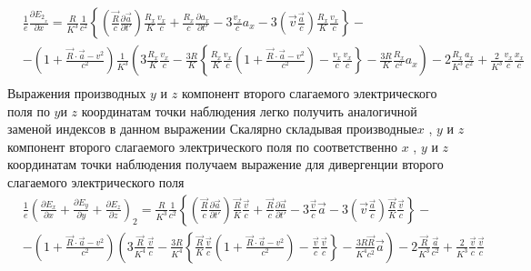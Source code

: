 \documentclass[11pt]{article}
\begin{document}
\[\begin{align}
  & \frac{1}{e}\frac{\partial {{E}_{2}}_{_{x}}}{\partial x}=\frac{R}{{{K}^{3}}}\frac{1}{{{c}^{2}}}\left\{ \left( \frac{\overrightarrow{R}}{c}\frac{\partial \overrightarrow{a}}{\partial t'} \right)\frac{{{R}_{x}}}{K}\frac{{{v}_{x}}}{c}+\frac{{{R}_{x}}}{c}\frac{\partial {{a}_{x}}}{\partial t'}-3\frac{{{v}_{x}}}{c}{{a}_{x}}-3\left( \overrightarrow{v}\frac{\overrightarrow{a}}{c} \right)\frac{{{R}_{x}}}{K}\frac{{{v}_{x}}}{c} \right\}- \\
 & -\left( 1+\frac{\overrightarrow{R}\cdot \overrightarrow{a}-{{v}^{2}}}{{{c}^{2}}} \right)\frac{1}{{{K}^{3}}}\left( 3\frac{{{R}_{x}}}{K}\frac{{{v}_{x}}}{c}-\frac{3R}{K}\left\{ \frac{{{R}_{x}}}{K}\frac{{{v}_{x}}}{c}\left( 1+\frac{\overrightarrow{R}\cdot \overrightarrow{a}-{{v}^{2}}}{{{c}^{2}}} \right)-\frac{{{v}_{x}}}{c}\frac{{{v}_{x}}}{c} \right\}-\frac{3R}{K}\frac{{{R}_{x}}}{{{c}^{2}}}{{a}_{x}} \right)-2\frac{{{R}_{x}}}{{{K}^{3}}}\frac{{{a}_{x}}}{{{c}^{2}}}+\frac{2}{{{K}^{3}}}\frac{{{v}_{x}}}{c}\frac{{{x}_{x}}}{c} \\
\end{align}\] Выражения производных \(y\) и \(z\) компонент второго
слагаемого электрического поля по \(y\)и \(z\) координатам точки
наблюдения легко получить аналогичной заменой индексов в данном
выражении Скалярно складывая производные\(x\) , \(y\) и \(z\)компонент
второго слагаемого электрического поля по соответственно \(x\) , \(y\) и
\(z\)координатам точки наблюдения получаем выражение для дивергенции
второго слагаемого электрического поля \[\begin{align}
  & \frac{1}{e}{{\left( \frac{\partial {{E}_{x}}}{\partial x}+\frac{\partial {{E}_{y}}}{\partial y}+\frac{\partial {{E}_{z}}}{\partial z} \right)}_{2}}=\frac{R}{{{K}^{3}}}\frac{1}{{{c}^{2}}}\left\{ \left( \frac{\overrightarrow{R}}{c}\frac{\partial \overrightarrow{a}}{\partial t'} \right)\frac{\overrightarrow{R}}{K}\frac{\overrightarrow{v}}{c}+\frac{\overrightarrow{R}}{c}\frac{\partial \overrightarrow{a}}{\partial t'}-3\frac{\overrightarrow{v}}{c}\overrightarrow{a}-3\left( \overrightarrow{v}\frac{\overrightarrow{a}}{c} \right)\frac{\overrightarrow{R}}{K}\frac{\overrightarrow{v}}{c} \right\}- \\
 & -\left( 1+\frac{\overrightarrow{R}\cdot \overrightarrow{a}-{{v}^{2}}}{{{c}^{2}}} \right)\left( 3\frac{\overrightarrow{R}}{{{K}^{4}}}\frac{\overrightarrow{v}}{c}-\frac{3R}{{{K}^{4}}}\left\{ \frac{\overrightarrow{R}}{K}\frac{\overrightarrow{v}}{c}\left( 1+\frac{\overrightarrow{R}\cdot \overrightarrow{a}-{{v}^{2}}}{{{c}^{2}}} \right)-\frac{\overrightarrow{v}}{c}\frac{\overrightarrow{v}}{c} \right\}-\frac{3R\overrightarrow{R}}{{{K}^{4}}{{c}^{2}}}\overrightarrow{a} \right)-2\frac{\overrightarrow{R}}{{{K}^{3}}}\frac{\overrightarrow{a}}{{{c}^{2}}}+\frac{2}{{{K}^{3}}}\frac{\overrightarrow{v}}{c}\frac{\overrightarrow{v}}{c} \\
\end{align}\]
\end{document}
